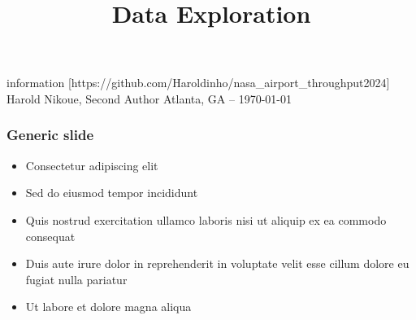 \documentclass[11pt,xcolor={dvipsnames},hyperref={pdftex,pdfpagemode=UseNone,hidelinks,pdfdisplaydoctitle=true},usepdftitle=false]{beamer}
\begin{document}
\title{Data Exploration}
information
%
[https://github.com/Haroldinho/nasa\_airport\_throughput2024]
%
{Harold Nikoue, Second Author}
%
{Atlanta, GA -- \today}

\frame{\titlepage}

\begin{frame}
\frametitle{Generic slide}
\begin{itemize}
\item Consectetur adipiscing elit
\item Sed do eiusmod tempor incididunt
\item Quis nostrud exercitation ullamco laboris nisi ut aliquip ex ea commodo consequat
\item Duis aute irure dolor in reprehenderit in voluptate velit esse cillum dolore eu fugiat nulla pariatur
\item Ut labore et dolore magna aliqua
\end{itemize}
\end{frame}
\end{document}
